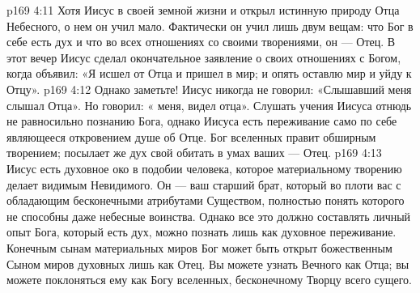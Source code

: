 \vs p169 4:11 \pc Хотя Иисус в своей земной жизни и открыл истинную природу Отца Небесного, о нем он учил мало. Фактически он учил лишь двум вещам: что Бог в себе есть дух и что во всех отношениях со своими творениями, он --- Отец. В этот вечер Иисус сделал окончательное заявление о своих отношениях с Богом, когда объявил: «Я исшел от Отца и пришел в мир; и опять оставлю мир и уйду к Отцу».
\vs p169 4:12 Однако заметьте! Иисус никогда не говорил: «Слышавший меня слышал Отца». Но говорил: « меня, видел отца». Слушать учения Иисуса отнюдь не равносильно познанию Бога, однако  Иисуса есть переживание само по себе являющееся откровением душе об Отце. Бог вселенных правит обширным творением; посылает же дух свой обитать в умах ваших --- Отец.
\vs p169 4:13 Иисус есть духовное око в подобии человека, которое материальному творению делает видимым Невидимого. Он --- ваш старший брат, который во плоти  вас с обладающим бесконечными атрибутами Существом, полностью понять которого не способны даже небесные воинства. Однако все это должно составлять личный опыт  Бога, который есть дух, можно познать лишь как духовное переживание. Конечным сынам материальных миров Бог может быть открыт божественным Сыном миров духовных лишь как Отец. Вы можете узнать Вечного как Отца; вы можете поклоняться ему как Богу вселенных, бесконечному Творцу всего сущего.
